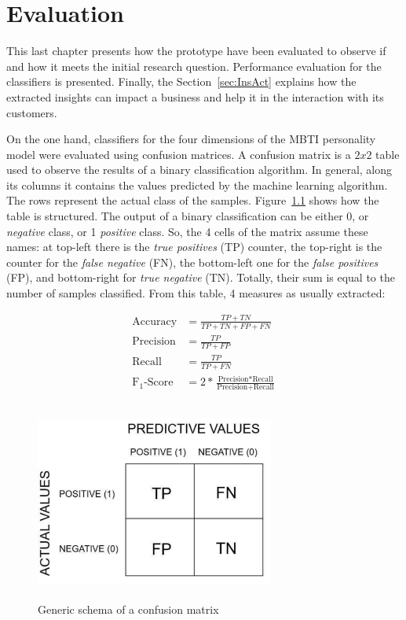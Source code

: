 \chapter{Evaluation}
\label{cha:evaluation}
This last chapter presents how the prototype have been evaluated to observe if and how it meets the initial research question.
Performance evaluation for the classifiers is presented. Finally, the Section~\ref{sec:InsAct} explains how the extracted insights can impact a business and help it in the interaction with its customers.

On the one hand, classifiers for the four dimensions of the MBTI personality model were evaluated using confusion matrices.
A confusion matrix is a $2x2$ table used to observe the results of a binary classification algorithm.
In general, along its columns it contains the values predicted by the machine learning algorithm. The rows represent the actual class of the samples. Figure~\ref{fig:confMat} shows how the table is structured.
The output of a binary classification can be either 0, or \textit{negative} class, or 1 \textit{positive} class.
So, the 4 cells of the matrix assume these names: at top-left there is the \textit{true positives} (TP) counter, the top-right is the counter for the \textit{false negative} (FN), the bottom-left one for the \textit{false positives} (FP), and bottom-right for \textit{true negative} (TN).
Totally, their sum is equal to the number of samples classified.
From this table, 4 measures as usually extracted: 

\begin{equation*}
\begin{split}
\text{Accuracy} & = \frac{TP + TN}{TP + TN + FP + FN}\\
\text{Precision} & = \frac{TP}{TP + FP} \\ 
\text{Recall} & = \frac{TP}{TP + FN}\\
\text{F}_1\text{-Score} & = 2 * \frac{\text{Precision} * \text{Recall}}{\text{Precision} + \text{Recall}}
\end{split}
\end{equation*}

\begin{figure}
\centering
\includegraphics[width=%
0.7\textwidth,height=6.5cm,keepaspectratio]{img/confMatrix.pdf}
\caption{Generic schema of a confusion matrix}
\label{fig:confMat}
\end{figure}

